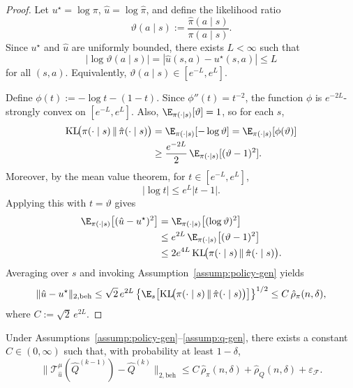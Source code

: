 \begin{proof}
Let \(u^\star=\log \pi\), \(\hat u=\log \hat\pi\), and define the likelihood
ratio
\[
\vartheta(a\mid s):=\frac{\hat\pi(a\mid s)}{\pi(a\mid s)}.
\]
Since \(u^\star\) and \(\hat u\) are uniformly bounded, there exists \(L<\infty\)
such that
\[
|\log \vartheta(a\mid s)| = |\hat u(s,a)-u^\star(s,a)| \le L
\]
for all \((s,a)\). Equivalently, \(\vartheta(a\mid s)\in [e^{-L},e^L]\).

Define \(\phi(t):=-\log t-(1-t)\). Since \(\phi''(t)=t^{-2}\), the function
\(\phi\) is \(e^{-2L}\)-strongly convex on \([e^{-L},e^L]\). Also,
\(\E_{\pi(\cdot\mid s)}[\vartheta]=1\), so for each \(s\),
\begin{align*}
\mathrm{KL}\!\big(\pi(\cdot\mid s)\,\|\,\hat\pi(\cdot\mid s)\big)
&=
\E_{\pi(\cdot\mid s)}[-\log \vartheta]
=
\E_{\pi(\cdot\mid s)}[\phi(\vartheta)] \\
&\ge
\frac{e^{-2L}}{2}\,
\E_{\pi(\cdot\mid s)}[(\vartheta-1)^2].
\end{align*}
Moreover, by the mean value theorem, for \(t\in[e^{-L},e^L]\),
\[
|\log t|
\le
e^L |t-1|.
\]
Applying this with \(t=\vartheta\) gives
\begin{align*}
\E_{\pi(\cdot\mid s)}\big[(\hat u-u^\star)^2\big]
&=
\E_{\pi(\cdot\mid s)}\big[(\log \vartheta)^2\big] \\
&\le
e^{2L}\,\E_{\pi(\cdot\mid s)}\big[(\vartheta-1)^2\big] \\
&\le
2e^{4L}\,
\mathrm{KL}\!\big(\pi(\cdot\mid s)\,\|\,\hat\pi(\cdot\mid s)\big).
\end{align*}
Averaging over \(s\) and invoking Assumption~\ref{assump:policy-gen} yields
\[
\|\hat u-u^\star\|_{2,\mathrm{beh}}
\le
\sqrt{2}\,e^{2L}
\left\{
\E_s\!\left[
\mathrm{KL}\!\big(\pi(\cdot\mid s)\,\|\,\hat\pi(\cdot\mid s)\big)
\right]
\right\}^{1/2}
\le
C\,\hat\rho_{\pi}(n,\delta),
\]
where \(C:=\sqrt{2}\,e^{2L}\).
\end{proof}

\begin{lemma}
\label{lemma::periter}
Under Assumptions~\ref{assump:policy-gen}--\ref{assump:q-gen}, there exists a
constant \(C \in (0,\infty)\) such that, with probability at least \(1-\delta\),
\[
\|\mathcal T_{\hat u}^\mu(\hat Q^{(k-1)})-\hat Q^{(k)}\|_{2,\mathrm{beh}}
\le
C\,\hat\rho_\pi(n,\delta)+\hat\rho_{Q}(n,\delta)+\varepsilon_{\mathcal F}.
\]
\end{lemma}


